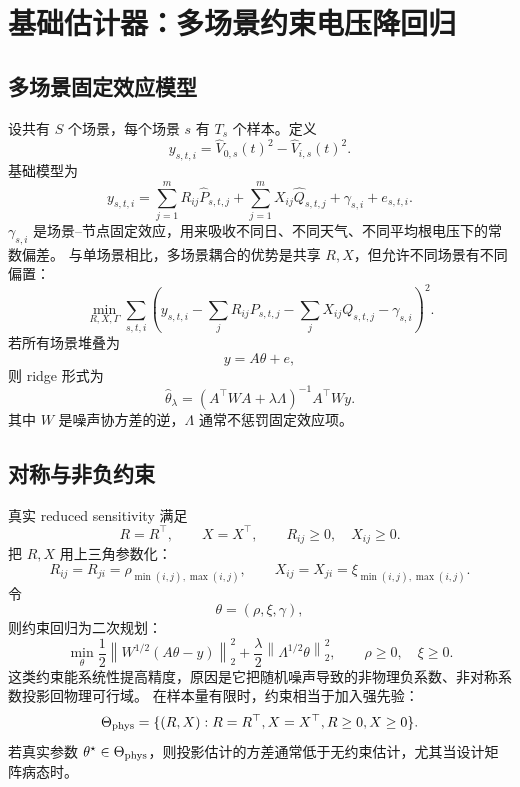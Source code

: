 \documentclass[UTF8,11pt]{ctexart}
\newcommand{\norm}[1]{\left\lVert #1 \right\rVert}
\begin{document}
\section{基础估计器：多场景约束电压降回归}

\subsection{多场景固定效应模型}

设共有 $S$ 个场景，每个场景 $s$ 有 $T_s$ 个样本。定义
\[
    y_{s,t,i}=\widehat V_{0,s}(t)^2-\widehat V_{i,s}(t)^2.
\]
基础模型为
\begin{equation}
    y_{s,t,i}
    =
    \sum_{j=1}^m R_{ij}\widehat P_{s,t,j}
    +
    \sum_{j=1}^m X_{ij}\widehat Q_{s,t,j}
    +
    \gamma_{s,i}
    +
    e_{s,t,i}.
    \label{eq:multiscenario}
\end{equation}
$\gamma_{s,i}$ 是场景--节点固定效应，用来吸收不同日、不同天气、不同平均根电压下的常数偏差。
与单场景相比，多场景耦合的优势是共享 $R,X$，但允许不同场景有不同偏置：
\begin{equation}
    \min_{R,X,\Gamma}
    \sum_{s,t,i}
    \left(
      y_{s,t,i}
      -\sum_j R_{ij}P_{s,t,j}
      -\sum_j X_{ij}Q_{s,t,j}
      -\gamma_{s,i}
    \right)^2.
    \label{eq:ols}
\end{equation}
若所有场景堆叠为
\[
    y=A\theta+e,
\]
则 ridge 形式为
\begin{equation}
    \widehat\theta_\lambda
    =
    (A^\top W A+\lambda \Lambda)^{-1}A^\top W y.
    \label{eq:ridge}
\end{equation}
其中 $W$ 是噪声协方差的逆，$\Lambda$ 通常不惩罚固定效应项。

\subsection{对称与非负约束}

真实 reduced sensitivity 满足
\[
    R=R^\top,\qquad X=X^\top,\qquad R_{ij}\ge0,\quad X_{ij}\ge0.
\]
把 $R,X$ 用上三角参数化：
\[
    R_{ij}=R_{ji}=\rho_{\min(i,j),\max(i,j)},\qquad
    X_{ij}=X_{ji}=\xi_{\min(i,j),\max(i,j)}.
\]
令
\[
    \theta=(\rho,\xi,\gamma),
\]
则约束回归为二次规划：
\begin{equation}
    \min_{\theta}
    \frac12\norm{W^{1/2}(A\theta-y)}_2^2+\frac{\lambda}{2}\norm{\Lambda^{1/2}\theta}_2^2,
    \qquad
    \rho\ge0,\quad \xi\ge0.
    \label{eq:nnls}
\end{equation}
这类约束能系统性提高精度，原因是它把随机噪声导致的非物理负系数、非对称系数投影回物理可行域。
在样本量有限时，约束相当于加入强先验：
\[
    \Theta_{\rm phys}
    =
    \{(R,X):R=R^\top,X=X^\top,R\ge0,X\ge0\}.
\]
若真实参数 $\theta^\star\in\Theta_{\rm phys}$，则投影估计的方差通常低于无约束估计，尤其当设计矩阵病态时。
\end{document}
